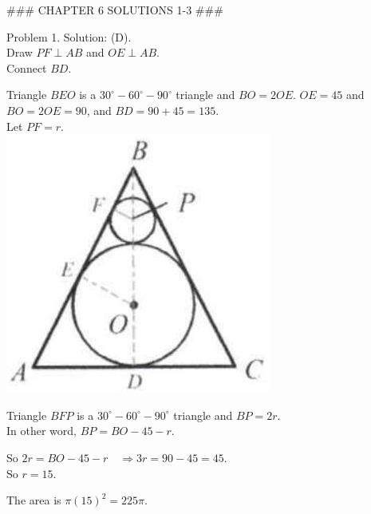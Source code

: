 \documentclass[10pt]{article}
\begin{document}
### CHAPTER 6 SOLUTIONS 1-3 ###

Problem 1. Solution: (D).\\
Draw \(P F \perp A B\) and \(O E \perp A B\).\\
Connect \(B D\).

Triangle \(B E O\) is a \(30^{\circ}-60^{\circ}-90^{\circ}\) triangle and \(B O=2 O E\). \(O E=45\) and \(B O=2 O E=90\), and \(B D=90+45=135\).\\
Let \(P F=r\).\\
\includegraphics[max width=\textwidth, center]{2025_04_17_97bc1f7e44d93c271a88g-187(2)}

Triangle \(B F P\) is a \(30^{\circ}-60^{\circ}-90^{\circ}\) triangle and \(B P=2 r\).\\
In other word, \(B P=B O-45-r\).

So \(2 r=B O-45-r \quad \Rightarrow 3 r=90-45=45\).\\
So \(r=15\).

The area is \(\pi(15)^{2}=225 \pi\).
\end{document}
